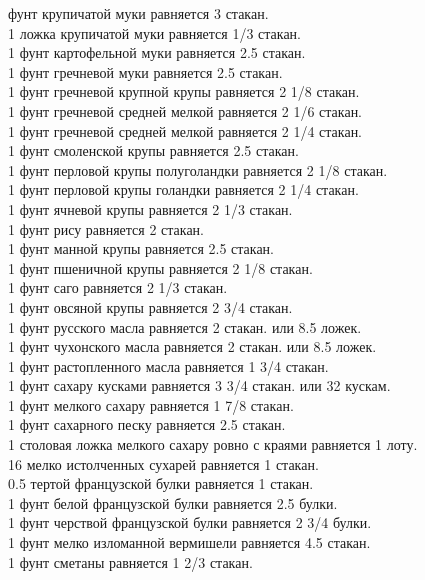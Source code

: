  фунт крупичатой муки равняется 3 стакан.\\
1 ложка крупичатой муки равняется 1/3 стакан.\\
1 фунт картофельной муки равняется 2.5 стакан.\\
1 фунт гречневой муки равняется 2.5 стакан.\\
1 фунт гречневой крупной крупы равняется 2 1/8 стакан.\\
1 фунт гречневой средней мелкой равняется 2 1/6 стакан.\\
1 фунт гречневой средней мелкой равняется 2 1/4 стакан.\\
1 фунт смоленской крупы равняется 2.5 стакан.\\
1 фунт перловой крупы полуголандки равняется 2 1/8 стакан.\\
1 фунт перловой крупы голандки равняется 2 1/4 стакан.\\
1 фунт ячневой крупы равняется 2 1/3 стакан.\\
1 фунт рису равняется 2 стакан.\\
1 фунт манной крупы равняется 2.5 стакан.\\
1 фунт пшеничной крупы равняется 2 1/8 стакан.\\
1 фунт саго равняется 2 1/3 стакан.\\
1 фунт овсяной крупы равняется 2 3/4 стакан.\\
1 фунт русского масла равняется 2 стакан. или 8.5 ложек.\\
1 фунт чухонского масла равняется 2 стакан. или 8.5 ложек.\\
1 фунт растопленного масла равняется 1 3/4 стакан.\\
1 фунт сахару кусками равняется 3 3/4 стакан. или 32 кускам.\\
1 фунт мелкого сахару равняется 1 7/8 стакан.\\
1 фунт сахарного песку равняется 2.5 стакан.\\
1 столовая ложка мелкого сахару ровно с краями равняется 1 лоту.\\
16 мелко истолченных сухарей равняется 1 стакан.\\
0.5 тертой французской булки равняется 1 стакан.\\
1 фунт белой французской булки равняется 2.5 булки.\\
1 фунт черствой французской булки равняется 2 3/4 булки.\\
1 фунт мелко изломанной вермишели равняется 4.5 стакан.\\
1 фунт сметаны равняется 1 2/3 стакан.\\
